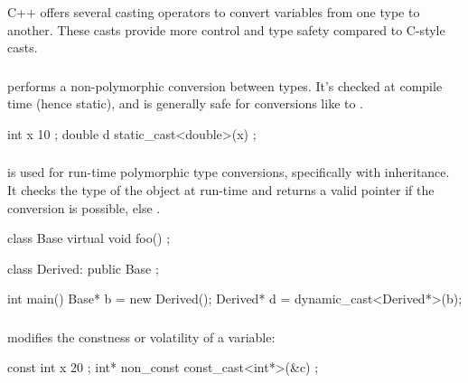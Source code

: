 \documentclass[12pt]{article}
\begin{document}
\noindent
C++ offers several casting operators to convert variables from one type to another.
These casts provide more control and type safety compared to C-style casts.

\subsubsection{}

\noindent
{} performs a non-polymorphic conversion between types.
It's checked at compile time (hence static), and is generally safe for conversions like  to .

\begin{cxx}{}
int x { 10 };
double d { static_cast<double>(x) };
\end{cxx}

\subsubsection{}

\noindent
{} is used for run-time polymorphic type conversions, specifically with inheritance.
It checks the type of the object at run-time and returns a valid pointer if the conversion is possible, else .

\begin{cxx}{}
class Base
{
	virtual void foo() {}
};

class Derived: public Base {};

int main()
{
	Base* b = new Derived();
	Derived* d = dynamic_cast<Derived*>(b);
}
\end{cxx}

\subsubsection{}

\noindent
{} modifies the constness or volatility of a variable:

\begin{cxx}{}
const int x { 20 };
int* non_const { const_cast<int*>(&c) };
\end{cxx}

\subsubsection{}
\end{document}
